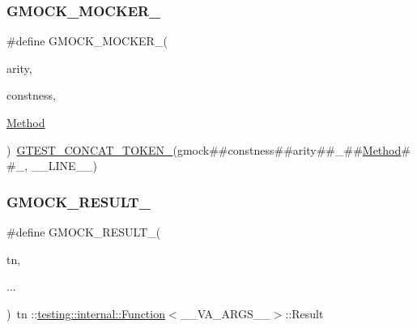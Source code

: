 \subsubsection{\texorpdfstring{GMOCK\_MOCKER\_}{GMOCK\_MOCKER\_}}
{\footnotesize\ttfamily \#define G\+M\+O\+C\+K\+\_\+\+M\+O\+C\+K\+E\+R\+\_\+(\begin{DoxyParamCaption}\item[{}]{arity,  }\item[{}]{constness,  }\item[{}]{\mbox{\hyperlink{gmock-spec-builders__test_8cc_a95606368148f3e5aab5db46c32466afd}{Method}} }\end{DoxyParamCaption})~\mbox{\hyperlink{gtest-internal_8h_ae3c336cbe1ae2bd1b1d019333e4428a0}{G\+T\+E\+S\+T\+\_\+\+C\+O\+N\+C\+A\+T\+\_\+\+T\+O\+K\+E\+N\+\_\+}}(gmock\#\#constness\#\#arity\#\#\+\_\+\#\#\mbox{\hyperlink{gmock-spec-builders__test_8cc_a95606368148f3e5aab5db46c32466afd}{Method}}\#\#\+\_\+, \+\_\+\+\_\+\+L\+I\+N\+E\+\_\+\+\_\+)}

\mbox{\label{gmock-generated-function-mockers_8h_a0e9d94e9c77df84f1103af06feee1077}} 
\subsubsection{\texorpdfstring{GMOCK\_RESULT\_}{GMOCK\_RESULT\_}}
{\footnotesize\ttfamily \#define G\+M\+O\+C\+K\+\_\+\+R\+E\+S\+U\+L\+T\+\_\+(\begin{DoxyParamCaption}\item[{}]{tn,  }\item[{}]{... }\end{DoxyParamCaption})~tn \+::\mbox{\hyperlink{structtesting_1_1internal_1_1Function}{testing\+::internal\+::\+Function}}$<$\+\_\+\+\_\+\+V\+A\+\_\+\+A\+R\+G\+S\+\_\+\+\_\+$>$\+::Result}

\mbox{\label{gmock-generated-function-mockers_8h_ac86e04e649fa8bf35b5f0149a13c935d}} 
